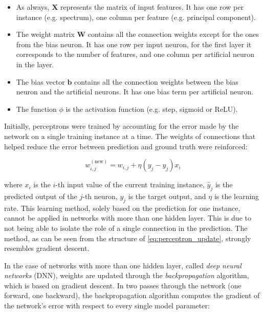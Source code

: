 \begin{itemize}
    \item As always, $\mathbf{X}$ represents the matrix of input features. It has one row per instance (e.g. spectrum), one column per feature (e.g. principal component).
    \item The weight matrix $\mathbf{W}$ contains all the connection weights except for the ones from the bias neuron. It has one row per input neuron, for the first layer it corresponds to the number of features, and one column per artificial neuron in the layer.
    \item The bias vector $\mathbf{b}$ contains all the connection weights between the bias neuron and the artificial neurons. It has one bias term per artificial neuron.
    \item The function $\phi$ is the activation function (e.g. step, sigmoid or ReLU).
\end{itemize}

Initially, perceptrons were trained by accounting for the error made by the network on a single training instance at a time. The weights of connections that helped reduce the error between prediction and ground truth were reinforced:

\begin{equation}
    w_{i,j}^{(\text{new})} = w_{i,j} + \eta \left( y_j - \hat{y}_j \right) x_i
    \label{eq:perceptron_update}
\end{equation}

where $x_i$ is the $i$-th input value of the current training instance, $\hat{y}_j$ is the predicted output of the $j$-th neuron, $y_j$ is the target output, and $\eta$ is the learning rate.
This learning method, solely based on the prediction for one instance, cannot be applied in networks with more than one hidden layer. This is due to not being able to isolate the role of a single connection in the prediction. The method, as can be seen from the structure of \cref{eq:perceptron_update}, strongly resembles gradient descent.

In the case of networks with more than one hidden layer, called \textit{deep neural networks} (DNN), weights are updated through the \textit{backpropagation} algorithm, which is based on gradient descent. In two passes through the network (one forward, one backward), the backpropagation algorithm computes the gradient of the network's error with respect to every single model parameter:

